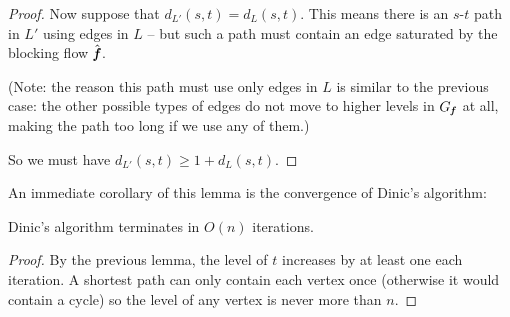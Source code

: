 \begin{proof}
  Now suppose that $d_{L'}(s, t) = d_L(s, t)$. This means there is an $s$-$t$ path in $L'$ using
  edges in $L$ -- but such a path must contain an edge saturated by
  the blocking flow $\hat{\boldsymbol{\mathit{f}}}$.

  (Note: the reason this path must use only edges in $L$ is similar to
  the previous case: the other possible types of edges do not move
  to higher levels in $G_{\boldsymbol{\mathit{f}}}$ at all, making the path too long if we use any of them.)

  So we must have $d_{L'}(s, t) \geq 1 + d_L(s, t)$.
\end{proof}
An immediate corollary of this lemma is the convergence of Dinic's algorithm:
\begin{theorem}
  Dinic's algorithm terminates in $O(n)$ iterations.
\end{theorem}
\begin{proof}
  By the previous lemma, the level of $t$ increases by at least one each iteration. A shortest path
  can only contain each vertex once (otherwise it would contain a cycle) so the level of any vertex
  is never more than $n$.
\end{proof}

